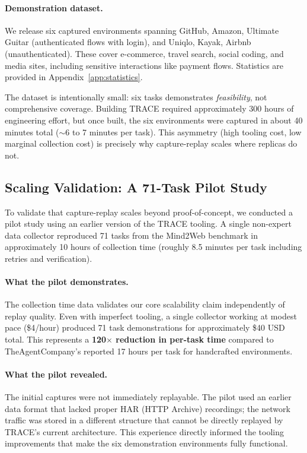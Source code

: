 \documentclass[letterpaper]{article}
\begin{document}
\paragraph{Demonstration dataset.} We release six captured environments spanning GitHub, Amazon, Ultimate Guitar (authenticated flows with login), and Uniqlo, Kayak, Airbnb (unauthenticated). These cover e-commerce, travel search, social coding, and media sites, including sensitive interactions like payment flows. Statistics are provided in Appendix~\ref{app:statistics}.

The dataset is intentionally small: six tasks demonstrates \emph{feasibility}, not comprehensive coverage. Building TRACE required approximately 300 hours of engineering effort, but once built, the six environments were captured in about 40 minutes total ($\sim$6 to 7 minutes per task). This asymmetry (high tooling cost, low marginal collection cost) is precisely why capture-replay scales where replicas do not.

\subsection{Scaling Validation: A 71-Task Pilot Study}
\label{sec:pilot}

To validate that capture-replay scales beyond proof-of-concept, we conducted a pilot study using an earlier version of the TRACE tooling. A single non-expert data collector reproduced 71 tasks from the Mind2Web benchmark in approximately 10 hours of collection time (roughly 8.5 minutes per task including retries and verification).

\paragraph{What the pilot demonstrates.} The collection time data validates our core scalability claim independently of replay quality. Even with imperfect tooling, a single collector working at modest pace (\$4/hour) produced 71 task demonstrations for approximately \$40 USD total. This represents a \textbf{120$\times$ reduction in per-task time} compared to TheAgentCompany's reported 17 hours per task for handcrafted environments.

\paragraph{What the pilot revealed.} The initial captures were not immediately replayable. The pilot used an earlier data format that lacked proper HAR (HTTP Archive) recordings; the network traffic was stored in a different structure that cannot be directly replayed by TRACE's current architecture. This experience directly informed the tooling improvements that make the six demonstration environments fully functional.
\end{document}
